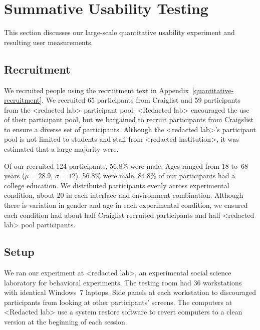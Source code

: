 \documentclass[USenglish,oneside,twocolumn]{article}
\begin{document}
\section{Summative Usability Testing}
\label{sec:quantitative}
This section discusses our large-scale quantitative usability experiment and resulting user measurements. 

\subsection{Recruitment}
We recruited  people using the recruitment text in Appendix~\ref{quantitative-recruitment}. We recruited 65 participants from Craiglist and 59 participants from the <redacted lab> participant pool. <Redacted lab> encouraged the use of their participant pool, but we bargained to recruit participants from Craigslist to ensure a diverse set of participants. Although the <redacted lab>'s participant pool is not limited to students and staff from <redacted institution>, it was estimated that a large majority were. 

Of our recruited 124 participants, 56.8\% were male. Ages ranged from 18 to~68 years ($\mu = 28.9$, $\sigma = 12$). 56.8\% were male. 84.8\% of our participants had a college education. We distributed participants evenly across experimental condition, about 20 in each interface and environment combination. Although there is variation in gender and age in each experimental condition, we ensured each condition had about half Craiglist recruited participants and half <redacted lab>  pool participants. 

\subsection{Setup}
We ran our experiment at <redacted lab>, an experimental social science laboratory for behavioral experiments. The testing room had 36 workstations with identical Windows~7 laptops. Side panels at each workstation to discouraged participants from looking at other participants' screens. 
The computers at <Redacted lab> use a system restore software to revert computers to a clean version at the beginning of each session. 
\end{document}
